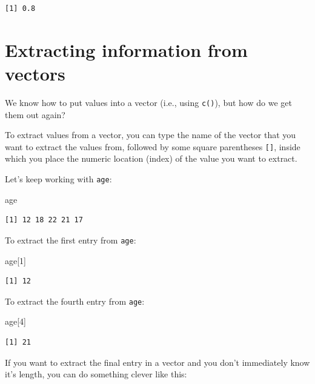 \documentclass[
  letterpaper,
  DIV=11,
  numbers=noendperiod]{scrreprt}
\newenvironment{Shaded}{\begin{snugshade}}{\end{snugshade}}
\newcommand{\DecValTok}[1]{\textcolor[rgb]{0.68,0.00,0.00}{#1}}
\newcommand{\NormalTok}[1]{\textcolor[rgb]{0.00,0.23,0.31}{#1}}
\begin{document}
\begin{verbatim}
[1] 0.8
\end{verbatim}

\section{Extracting information from
vectors}\label{extracting-information-from-vectors}

We know how to put values into a vector (i.e., using \texttt{c()}), but
how do we get them out again?

To extract values from a vector, you can type the name of the vector
that you want to extract the values from, followed by some square
parentheses \texttt{{[}{]}}, inside which you place the numeric location
(index) of the value you want to extract.

Let's keep working with \texttt{age}:

\begin{Shaded}
\begin{Highlighting}[]
\NormalTok{age}
\end{Highlighting}
\end{Shaded}

\begin{verbatim}
[1] 12 18 22 21 17
\end{verbatim}

To extract the first entry from \texttt{age}:

\begin{Shaded}
\begin{Highlighting}[]
\NormalTok{age[}\DecValTok{1}\NormalTok{]}
\end{Highlighting}
\end{Shaded}

\begin{verbatim}
[1] 12
\end{verbatim}

To extract the fourth entry from \texttt{age}:

\begin{Shaded}
\begin{Highlighting}[]
\NormalTok{age[}\DecValTok{4}\NormalTok{]}
\end{Highlighting}
\end{Shaded}

\begin{verbatim}
[1] 21
\end{verbatim}

If you want to extract the final entry in a vector and you don't
immediately know it's length, you can do something clever like this:
\end{document}
